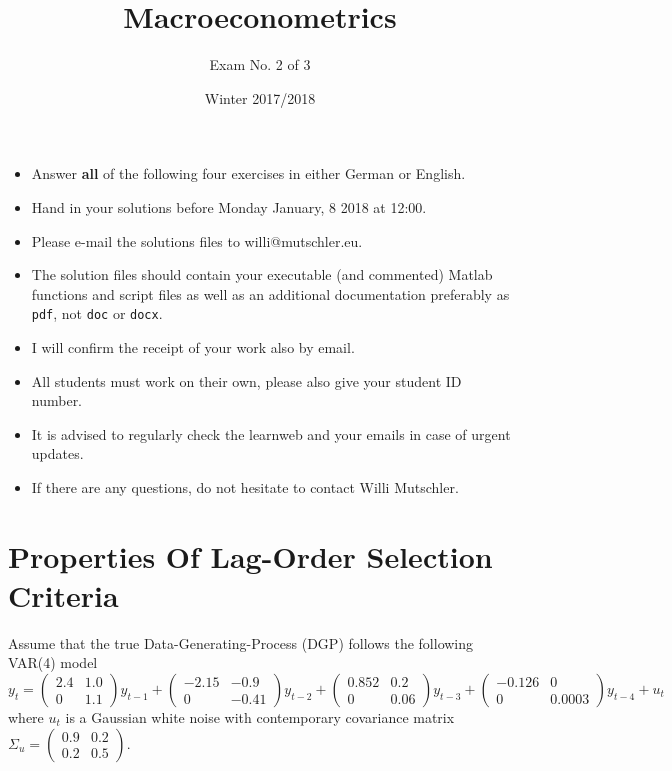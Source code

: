 \documentclass{article}
\begin{document}
	
	\title{Macroeconometrics}
	\author{Exam No. 2 of 3}
	\date{Winter 2017/2018}
	\maketitle
	
	\begin{itemize}
		\item Answer \textbf{all} of the following four exercises in either German or English.
		
		\item Hand in your solutions before Monday January, 8 2018 at 12:00.
		
		\item Please e-mail the solutions files to willi@mutschler.eu. 
		
		\item The solution files should contain your executable (and commented) Matlab functions and script files as well as an additional documentation preferably as \texttt{pdf}, not \texttt{doc} or \texttt{docx}. 
		
		\item I will confirm the receipt of your work also by email.
		
		\item All students must work on their own, please also give your student ID number.
		
		\item It is advised to regularly check the learnweb and your emails in case of urgent updates.
		
		\item If there are any questions, do not hesitate to contact Willi Mutschler.
	\end{itemize}
	\newpage
	
\section{Properties Of Lag-Order Selection Criteria}
Assume that the true Data-Generating-Process (DGP) follows the following VAR(4) model
$$y_t = \begin{pmatrix}
2.4 & 1.0\\
0 & 1.1
\end{pmatrix}
y_{t-1}+
\begin{pmatrix}
-2.15 & -0.9\\
0 & -0.41
\end{pmatrix}
y_{t-2}+
\begin{pmatrix}
0.852 & 0.2\\
0& 0.06
\end{pmatrix}
y_{t-3}+
\begin{pmatrix}
-0.126 & 0\\
0 & 0.0003
\end{pmatrix}
y_{t-4}
+ u_t$$
where $u_t$ is a Gaussian white noise with contemporary covariance matrix $\Sigma_u = \begin{pmatrix}
0.9&0.2\\0.2&0.5
\end{pmatrix}$.
\end{document}
